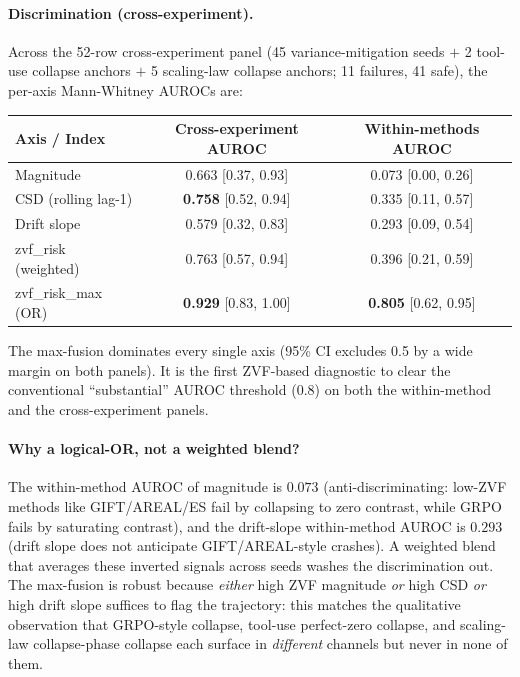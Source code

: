 \documentclass{article}
\begin{document}
\paragraph{Discrimination (cross-experiment).} Across the 52-row
cross-experiment panel (45 variance-mitigation seeds $+$ 2 tool-use
collapse anchors $+$ 5 scaling-law collapse anchors; 11 failures,
41 safe), the per-axis Mann-Whitney AUROCs are:
\begin{center}
\small
\begin{tabular}{lcc}
\hline
Axis / Index & Cross-experiment AUROC & Within-methods AUROC \\
\hline
Magnitude              & 0.663 [0.37, 0.93] & 0.073 [0.00, 0.26] \\
CSD (rolling lag-1)    & \textbf{0.758} [0.52, 0.94] & 0.335 [0.11, 0.57] \\
Drift slope            & 0.579 [0.32, 0.83] & 0.293 [0.09, 0.54] \\
zvf\_risk (weighted)   & 0.763 [0.57, 0.94] & 0.396 [0.21, 0.59] \\
zvf\_risk\_max (OR)    & \textbf{0.929} [0.83, 1.00] & \textbf{0.805} [0.62, 0.95] \\
\hline
\end{tabular}
\end{center}
The max-fusion dominates every single axis (95\% CI excludes 0.5 by a
wide margin on both panels). It is the first ZVF-based diagnostic to
clear the conventional ``substantial'' AUROC threshold ($0.8$) on both
the within-method and the cross-experiment panels.

\paragraph{Why a logical-OR, not a weighted blend?} The within-method
AUROC of magnitude is $0.073$ (anti-discriminating: low-ZVF methods
like GIFT/AREAL/ES fail by collapsing to zero contrast, while GRPO
fails by saturating contrast), and the drift-slope within-method AUROC
is $0.293$ (drift slope does not anticipate GIFT/AREAL-style
crashes). A weighted blend that averages these inverted signals across
seeds washes the discrimination out. The max-fusion is robust because
\emph{either} high ZVF magnitude \emph{or} high CSD \emph{or} high
drift slope suffices to flag the trajectory: this matches the
qualitative observation that GRPO-style collapse, tool-use perfect-zero
collapse, and scaling-law collapse-phase collapse each surface in
\emph{different} channels but never in none of them.
\end{document}
